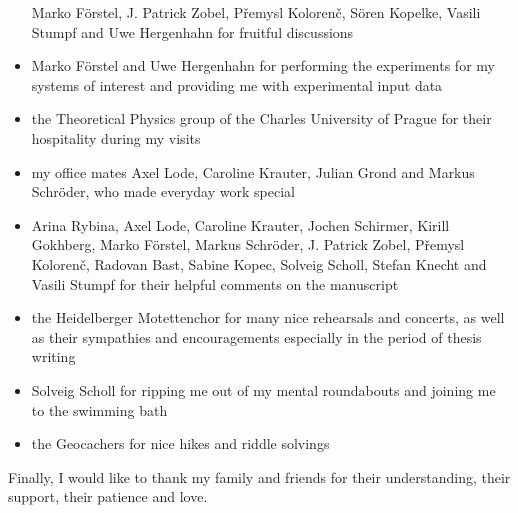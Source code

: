\begin{itemize}
       Marko Förstel, J. Patrick Zobel,
       P\v{r}emysl Koloren\v{c},
       Sören Kopelke, Vasili Stumpf and Uwe Hergenhahn for fruitful discussions
 \item Marko Förstel and Uwe Hergenhahn for performing the experiments
       for my systems of interest and providing me with experimental input data
 \item the Theoretical Physics group of the Charles University of Prague for
       their hospitality during my visits
 \item my office mates Axel Lode, Caroline Krauter, Julian Grond and Markus
       Schröder, who made everyday work special
 \item Arina Rybina, Axel Lode, Caroline Krauter, Jochen Schirmer,
       Kirill Gokhberg, Marko Förstel,
       Markus Schröder, J. Patrick Zobel, P\v{r}emysl Koloren\v{c},
       Radovan Bast, Sabine Kopec, Solveig Scholl, Stefan Knecht
       and Vasili Stumpf for their helpful comments on the manuscript
 \item the Heidelberger Motettenchor for many nice rehearsals and concerts,
       as well as their sympathies and encouragements especially in the period
       of thesis writing
 \item Solveig Scholl for ripping me out of my mental roundabouts and
       joining me to the swimming bath
 \item the Geocachers for nice hikes and riddle solvings
\end{itemize}

Finally, I would like to thank my family and friends for their understanding,
their support, their patience and love.
